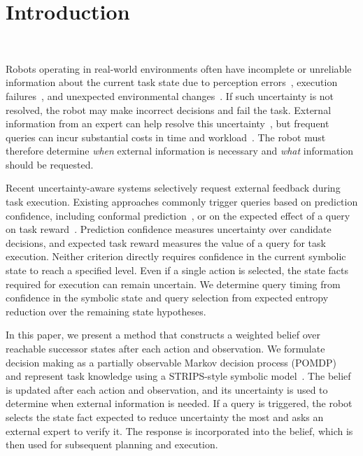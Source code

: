 \section{Introduction}~\label{intro}

Robots operating in real-world environments often have incomplete or unreliable information about the current task state due to perception errors~\cite{kaipa2016addressing}, execution failures~\cite{kaelbling1998planning}, and unexpected environmental changes~\cite{kurniawati2016online}. If such uncertainty is not resolved, the robot may make incorrect decisions and fail the task. External information from an expert can help resolve this uncertainty~\cite{dragan2013legibility, goodrich2008human}, but frequent queries can incur substantial costs in time and workload~\cite{chen2014human}. The robot must therefore determine \textit{when} external information is necessary and \textit{what} information should be requested.

Recent uncertainty-aware systems selectively request external feedback during task execution. Existing approaches commonly trigger queries based on prediction confidence, including conformal prediction~\cite{ren2023robots, liang2024introspective, mullen2025lbap}, or on the expected effect of a query on task reward~\cite{burks2021collaborative, anand2025adaptive}. Prediction confidence measures uncertainty over candidate decisions, and expected task reward measures the value of a query for task execution. Neither criterion directly requires confidence in the current symbolic state to reach a specified level. Even if a single action is selected, the state facts required for execution can remain uncertain. We determine query timing from confidence in the symbolic state and query selection from expected entropy reduction over the remaining state hypotheses.

In this paper, we present a method that constructs a weighted belief over reachable successor states after each action and observation. We formulate decision making as a partially observable Markov decision process (POMDP)~\cite{kaelbling1998planning} and represent task knowledge using a STRIPS-style symbolic model~\cite{davis1993knowledge,fikes1971strips}. The belief is updated after each action and observation, and its uncertainty is used to determine when external information is needed. If a query is triggered, the robot selects the state fact expected to reduce uncertainty the most and asks an external expert to verify it. The response is incorporated into the belief, which is then used for subsequent planning and execution.


